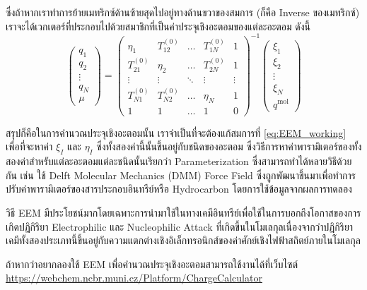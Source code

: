 %
ซึ่งถ้าหากเราทำการย้ายเมทริกซ์ด้านซ้ายสุดไปอยู่ทางด้านขวาของสมการ (ก็คือ Inverse ของเมทริกซ์) เราจะได้เวกเตอร์ที่ประกอบไปด้วยสมาชิกที่เป็นค่าประจุเชิงอะตอมของแต่ละอะตอม ดังนี้
%
\begin{equation}
  \label{eq:EEM_working}
  \left(\begin{array}{c}
      q_1    \\
      q_2    \\
      \vdots \\
      q_N    \\
      \mu
    \end{array}\right)
  =
  \left(\begin{array}{ccccc}
    \eta_1        & T_{12}^{(0)}  & \ldots & T_{1 N}^{(0)} & 1      \\
    T_{21}^{(0)}  & \eta_2        & \ldots & T_{2 N}^{(0)} & 1      \\
    \vdots        & \vdots        & \ddots & \vdots        & \vdots \\
    T_{N 1}^{(0)} & T_{N 2}^{(0)} & \ldots & \eta_N        & 1      \\
    1             & 1             & \ldots & 1             & 0
  \end{array}\right)^{-1}\left(\begin{array}{c}
      \xi_1  \\
      \xi_2  \\
      \vdots \\
      \xi_N  \\
      q^{\mathrm{mol}}
    \end{array}\right)
\end{equation}

สรุปก็คือในการคำนวณประจุเชิงอะตอมนั้น เราจำเป็นที่จะต้องแก้สมการที่ \eqref{eq:EEM_working} เพื่อที่จะหาค่า $\xi_I$ และ $\eta_I$ ซึ่งทั้งสองค่านี้นั้นขึ้นอยู่กับชนิดของอะตอม ซึ่งวิธีการหาค่าพารามิเตอร์ของทั้งสองค่าสำหรับแต่ละอะตอมแต่ละชนิดนั้นเรียกว่า Parameterization ซึ่งสามารถทำได้หลายวิธีด้วยกัน เช่น ใช้ Delft Molecular Mechanics (DMM) Force Field ซึ่งถูกพัฒนาขึ้นมาเพื่อทำการปรับค่าพารามิเตอร์ของสารประกอบอินทรีย์หรือ Hydrocarbon โดยการใช้ข้อมูลจากผลการทดลอง

วิธี EEM มีประโยชน์มากโดยเฉพาะการนำมาใช้ในทางเคมีอินทรีย์เพื่อใช้ในการบอกถึงโอกาสของการเกิดปฏิกิริยา Electrophilic และ Nucleophilic Attack ที่เกิดขึ้นในโมเลกุลเนื่องจากว่าปฏิกิริยาเคมีทั้งสองประเภทนี้ขึ้นอยู่กับความแตกต่างเชิงอิเล็กทรอนิกส์ของค่าศักย์เชิงไฟฟ้าสถิตย์ภายในโมเลกุล

ถ้าหากว่าอยากลองใช้ EEM เพื่อคำนวณประจุเชิงอะตอมสามารถใช้งานได้ที่เว็บไซต์ \url{https://webchem.ncbr.muni.cz/Platform/ChargeCalculator}


